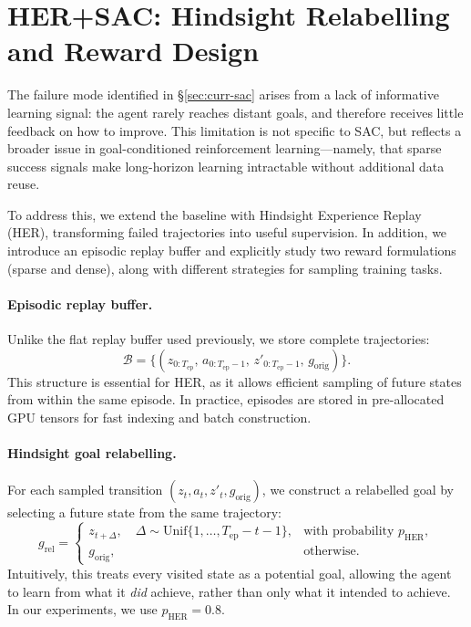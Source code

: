 \section{HER+SAC: Hindsight Relabelling and Reward Design}
\label{sec:her-sac}

The failure mode identified in \S\ref{sec:curr-sac} arises from a lack of
informative learning signal: the agent rarely reaches distant goals, and
therefore receives little feedback on how to improve. This limitation is
not specific to SAC, but reflects a broader issue in goal-conditioned
reinforcement learning—namely, that sparse success signals make
long-horizon learning intractable without additional data reuse.

To address this, we extend the baseline with Hindsight Experience Replay
(HER), transforming failed trajectories into useful supervision. In
addition, we introduce an episodic replay buffer and explicitly study two
reward formulations (sparse and dense), along with different strategies
for sampling training tasks.

\paragraph{Episodic replay buffer.}
Unlike the flat replay buffer used previously, we store complete
trajectories:
\begin{equation*}
\mathcal{B} = \big\{(z_{0:T_{\mathrm{ep}}},\,a_{0:T_{\mathrm{ep}}-1},\,z'_{0:T_{\mathrm{ep}}-1},\,g_{\mathrm{orig}})\big\}.
\end{equation*}
This structure is essential for HER, as it allows efficient sampling of
future states from within the same episode. In practice, episodes are
stored in pre-allocated GPU tensors for fast indexing and batch
construction.

\paragraph{Hindsight goal relabelling.}
For each sampled transition $(z_t, a_t, z'_t, g_{\mathrm{orig}})$, we
construct a relabelled goal by selecting a future state from the same
trajectory:
\begin{equation}
g_{\mathrm{rel}} =
\begin{cases}
z_{t+\Delta}, \quad \Delta \sim \mathrm{Unif}\{1, \dots, T_{\mathrm{ep}} - t - 1\}, & \text{with probability } p_{\mathrm{HER}}, \\
g_{\mathrm{orig}}, & \text{otherwise}.
\end{cases}
\label{eq:her-relabel-clean}
\end{equation}
Intuitively, this treats every visited state as a potential goal,
allowing the agent to learn from what it \emph{did} achieve, rather than
only what it intended to achieve. In our experiments, we use
$p_{\mathrm{HER}} = 0.8$.

